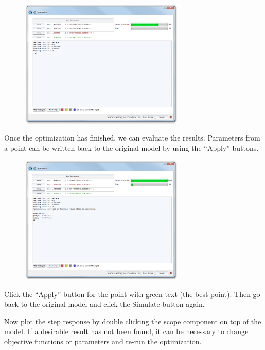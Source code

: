 \documentclass[a4paper,pdftex]{article}
\begin{document}
\begin{tutenumerate}
\FloatBarrier
\begin{figure}[htb]
\center
\includegraphics[width=0.7\textwidth]{gfx/optimization/screenshot-opt5b.png}
\end{figure}
\FloatBarrier

\newpage
{} 
Once the optimization has finished, we can evaluate the results. Parameters from a point can be written back to the original model by using the \enquote{Apply} buttons. 

\FloatBarrier
\begin{figure}[htb]
\center
\includegraphics[width=0.7\textwidth]{gfx/optimization/screenshot-opt5c.png}
\end{figure}
\FloatBarrier

Click the \enquote{Apply} button for the point with green text (the best point). Then go back to the original model and click the Simulate button again.


Now plot the step response by double clicking the scope component on top of the model. If a desirable result has not been found, it can be necessary to change objective functions or parameters and re-run the optimization.

\end{tutenumerate}
\end{document}
